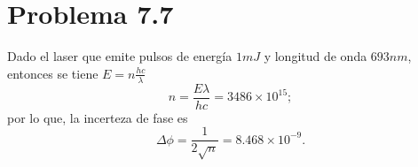 \section*{Problema 7.7}
Dado el laser que emite pulsos de energía $1mJ$ y longitud de onda $693nm$, entonces se tiene $E = n\frac{hc}{\lambda}$
	$$ n = \frac{E\lambda}{hc} = 3486\times 10^{15}; $$
por lo que, la incerteza de fase es
	$$ \Delta \phi = \frac{1}{2\sqrt{n}} = \boxed{ 8.468\times 10^{-9}. } $$




















